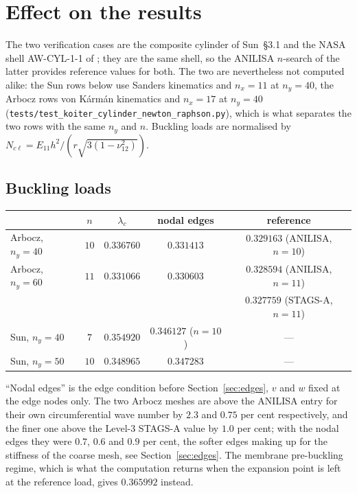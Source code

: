 \documentclass[11pt,a4paper]{article}
\begin{document}
\section{Effect on the results}
\label{sec:results}

The two verification cases are the composite cylinder of Sun~\S3.1 and the
NASA shell AW-CYL-1-1 of \citet{arbocz2001}; they are
the same shell, so the ANILISA $n$-search of the latter provides reference
values for both.  The two are nevertheless not computed alike: the Sun rows
below use Sanders kinematics and $n_x = 11$ at $n_y = 40$, the Arbocz rows von
K\'arm\'an kinematics and $n_x = 17$ at $n_y = 40$
(\texttt{tests/test\_koiter\_cylinder\_newton\_raphson.py}), which is what
separates the two rows with the same $n_y$ and $n$.  Buckling loads are normalised by $N_{c\ell} = E_{11}h^2 /
\left(r\sqrt{3(1-\nu_{12}^2)}\right)$.

\subsection{Buckling loads}

\begin{center}
\begin{tabular}{lcccc}
\toprule
 & $n$ & $\lambda_c$ & nodal edges & reference \\
\midrule
Arbocz, $n_y = 40$ & $10$ & $0.336760$ & $0.331413$ & $0.329163$ (ANILISA, $n=10$) \\
Arbocz, $n_y = 60$ & $11$ & $0.331066$ & $0.330603$ & $0.328594$ (ANILISA, $n=11$) \\
                        &      &            &            & $0.327759$ (STAGS-A, $n=11$) \\
Sun, $n_y = 40$    & $7$  & $0.354920$ & $0.346127$ ($n = 10$) & --- \\
Sun, $n_y = 50$    & $10$ & $0.348965$ & $0.347283$ & --- \\
\bottomrule
\end{tabular}
\end{center}

``Nodal edges'' is the edge condition before Section~\ref{sec:edges}, $v$
and $w$ fixed at the edge nodes only.  The two Arbocz meshes are above the
ANILISA entry for their own circumferential wave number by $2.3$ and $0.75$
per cent respectively, and the finer one above the Level-3 STAGS-A value by
$1.0$ per cent; with the nodal edges they were $0.7$, $0.6$ and $0.9$ per
cent, the softer edges making up for the stiffness of the coarse mesh, see
Section~\ref{sec:edges}.  The membrane
pre-buckling regime, which is what the computation returns when the expansion
point is left at the reference load, gives $0.365992$ instead.
\end{document}
